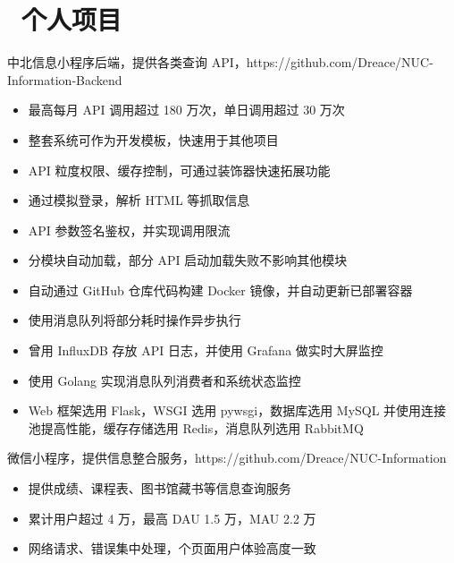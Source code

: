 \documentclass{resume}
\begin{document}
\section{\faUsers\ 个人项目}
\begin{onehalfspacing}
  中北信息小程序后端，提供各类查询 API，https://github.com/Dreace/NUC-Information-Backend
  \begin{itemize}
    \item 最高每月 API 调用超过 180 万次，单日调用超过 30 万次
    \item 整套系统可作为开发模板，快速用于其他项目
    \item API 粒度权限、缓存控制，可通过装饰器快速拓展功能
    \item 通过模拟登录，解析 HTML 等抓取信息
    \item API 参数签名鉴权，并实现调用限流
    \item 分模块自动加载，部分 API 启动加载失败不影响其他模块
    \item 自动通过 GitHub 仓库代码构建 Docker 镜像，并自动更新已部署容器
    \item 使用消息队列将部分耗时操作异步执行
    \item 曾用 InfluxDB 存放 API 日志，并使用 Grafana 做实时大屏监控
    \item 使用 Golang 实现消息队列消费者和系统状态监控 
    \item Web 框架选用 Flask，WSGI 选用 pywsgi，数据库选用 MySQL 并使用连接池提高性能，缓存存储选用 Redis，消息队列选用 RabbitMQ
  \end{itemize}
\end{onehalfspacing}

\begin{onehalfspacing}
  微信小程序，提供信息整合服务，https://github.com/Dreace/NUC-Information
  \begin{itemize}
    \item 提供成绩、课程表、图书馆藏书等信息查询服务
    \item 累计用户超过 4 万，最高 DAU 1.5 万，MAU 2.2 万
    \item 网络请求、错误集中处理，个页面用户体验高度一致
  \end{itemize}
\end{onehalfspacing}
\end{document}
